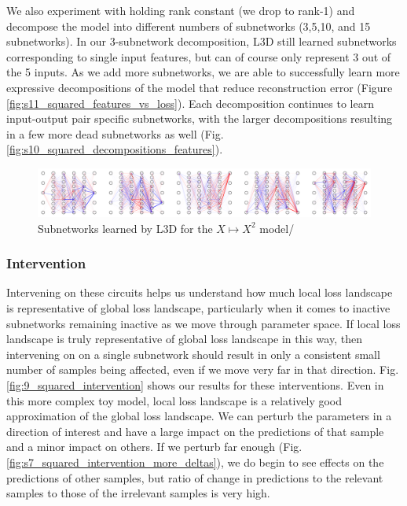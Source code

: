 \documentclass{article}
\theoremstyle{plain}
\theoremstyle{definition}
\theoremstyle{remark}
\begin{document}
We also experiment with holding rank constant (we drop to rank-1) and decompose the model into different numbers of subnetworks (3,5,10, and 15 subnetworks). In our 3-subnetwork decomposition, L3D still learned subnetworks corresponding to single input features, but can of course only represent 3 out of the 5 inputs. As we add more subnetworks, we are able to successfully learn more expressive decompositions of the model that reduce reconstruction error (Figure \ref{fig:s11_squared_features_vs_loss}). Each decomposition continues to learn input-output pair specific subnetworks, with the larger decompositions resulting in a few more dead subnetworks as well (Fig. \ref{fig:s10_squared_decompositions_features}).

\begin{figure}[htbp]
    \centerline{\includegraphics[width=\textwidth]{../figures/8_squared_subnetworks.pdf}}
    \centering
    \caption{Subnetworks learned by L3D for the $X \mapsto X^2$ model/}\label{fig:8_squared_subnetworks}
\end{figure}



\subsubsection{Intervention}

Intervening on these circuits helps us understand how much local loss landscape is representative of global loss landscape, particularly when it comes to inactive subnetworks remaining inactive as we move through parameter space. If local loss landscape is truly representative of global loss landscape in this way, then intervening on on a single subnetwork should result in only a consistent small number of samples being affected, even if we move very far in that direction. Fig. \ref{fig:9_squared_intervention} shows our results for these interventions. Even in this more complex toy model, local loss landscape is a relatively good approximation of the global loss landscape. We can perturb the parameters in a direction of interest and have a large impact on the predictions of that sample and a minor impact on others. If we perturb far enough (Fig. \ref{fig:s7_squared_intervention_more_deltas}), we do begin to see effects on the predictions of other samples, but ratio of change in predictions to the relevant samples to those of the irrelevant samples is very high.
\end{document}
